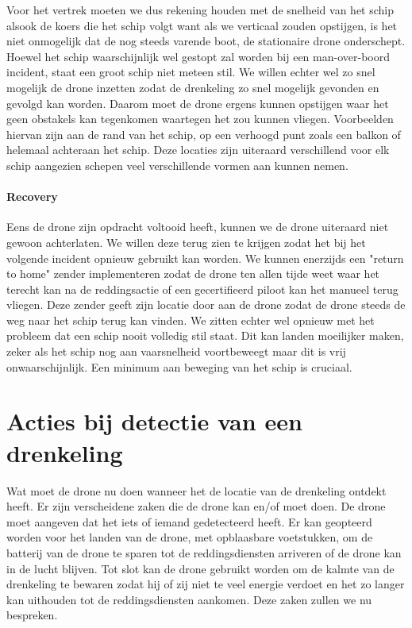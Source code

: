 Voor het vertrek moeten we dus rekening houden met de snelheid van het schip alsook de koers die het schip volgt want als we verticaal zouden opstijgen, is het niet onmogelijk dat de nog steeds varende boot, de stationaire drone onderschept. Hoewel het schip waarschijnlijk wel gestopt zal worden bij een man-over-boord incident, staat een groot schip niet meteen stil. We willen echter wel zo snel mogelijk de drone inzetten zodat de drenkeling zo snel mogelijk gevonden en gevolgd kan worden. Daarom moet de drone ergens kunnen opstijgen waar het geen obstakels kan tegenkomen waartegen het zou kunnen vliegen. Voorbeelden hiervan zijn aan de rand van het schip, op een verhoogd punt zoals een balkon of helemaal achteraan het schip. Deze locaties zijn uiteraard verschillend voor elk schip aangezien schepen veel verschillende vormen aan kunnen nemen.

\paragraph{Recovery}

Eens de drone zijn opdracht voltooid heeft, kunnen we de drone uiteraard niet gewoon achterlaten. We willen deze terug zien te krijgen zodat het bij het volgende incident opnieuw gebruikt kan worden. We kunnen enerzijds een "return to home" zender implementeren zodat de drone ten allen tijde weet waar het terecht kan na de reddingsactie of een gecertifieerd piloot kan het manueel terug vliegen. Deze zender geeft zijn locatie door aan de drone zodat de drone steeds de weg naar het schip terug kan vinden. We zitten echter wel opnieuw met het probleem dat een schip nooit volledig stil staat. Dit kan landen moeilijker maken, zeker als het schip nog aan vaarsnelheid voortbeweegt maar dit is vrij onwaarschijnlijk. Een minimum aan beweging van het schip is cruciaal.

\section{Acties bij detectie van een drenkeling}

Wat moet de drone nu doen wanneer het de locatie van de drenkeling ontdekt heeft. Er zijn verscheidene zaken die de drone kan en/of moet doen. De drone moet aangeven dat het iets of iemand gedetecteerd heeft. Er kan geopteerd worden voor het landen van de drone, met opblaasbare voetstukken, om de batterij van de drone te sparen tot de reddingsdiensten arriveren of de drone kan in de lucht blijven. Tot slot kan de drone gebruikt worden om de kalmte van de drenkeling te bewaren zodat hij of zij niet te veel energie verdoet en het zo langer kan uithouden tot de reddingsdiensten aankomen. Deze zaken zullen we nu bespreken.


